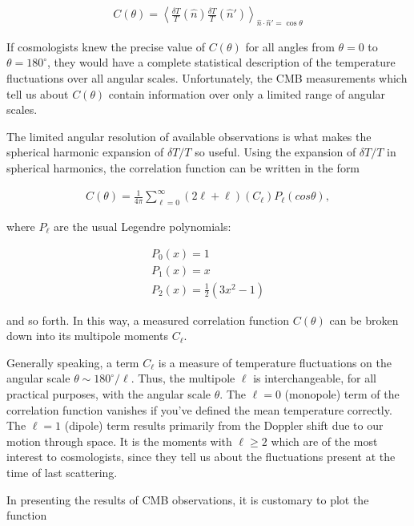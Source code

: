 \documentclass[a4paper,11pt]{article}
\begin{document}
\begin{align*}
    C(\theta) = \left\langle\frac{\delta T}{T}(\hat{n})\frac{\delta T}{T}(\hat{n}')\right\rangle_{\hat{n}\cdot\hat{n}'=\cos\theta}
\end{align*}

{\noindent}If cosmologists knew the precise value of $C(\theta)$ for all angles from $\theta=0$ to $\theta=180^\circ$, they would have a complete statistical description of the temperature fluctuations over all angular scales. Unfortunately, the CMB measurements which tell us about $C(\theta)$ contain information over only a limited range of angular scales.

{\noindent}The limited angular resolution of available observations is what makes the spherical harmonic expansion of $\delta T/T$ so useful. Using the expansion of $\delta T/T$ in spherical harmonics, the correlation function can be written in the form

\begin{align*}
    C(\theta) = \frac{1}{4\pi} \sum\limits_{\ell=0}^\infty (2\ell+\ell)(C_\ell)P_\ell(cos\theta),
\end{align*}

{\noindent}where $P_\ell$ are the usual Legendre polynomials:

\begin{align*}
    P_0(x) = 1 \\
    P_1(x) = x \\
    P_2(x) = \frac{1}{2}(3x^2-1)
\end{align*}

{\noindent}and so forth. In this way, a measured correlation function $C(\theta)$ can be broken down into its multipole moments $C_\ell$.

{\noindent}Generally speaking, a term $C_\ell$ is a measure of temperature fluctuations on the angular scale $\theta\sim180^\circ/\ell$. Thus, the multipole $\ell$ is interchangeable, for all practical purposes, with the angular scale $\theta$. The $\ell=0$ (monopole) term of the correlation function vanishes if you've defined the mean temperature correctly. The $\ell=1$ (dipole) term results primarily from the Doppler shift due to our motion through space. It is the moments with $\ell\geq2$ which are of the most interest to cosmologists, since they tell us about the fluctuations present at the time of last scattering.

{\noindent}In presenting the results of CMB observations, it is customary to plot the function
\end{document}
